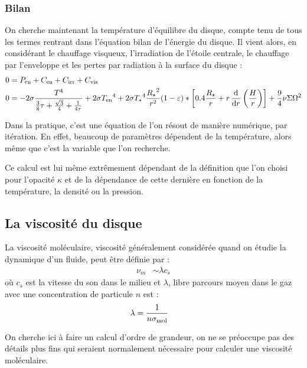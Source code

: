 \subsubsection{Bilan}
On cherche maintenant la température d'équilibre du disque, compte tenu de tous les termes rentrant dans l'équation bilan de l'énergie du disque. Il vient alors, en considérant le chauffage visqueux, l'irradiation de l'étoile centrale, le chauffage par l'enveloppe et les pertes par radiation à la surface du disque : 
\begin{align}
0 &= P_\text{cn} + C_\text{en} + C_\text{irr} + C_\text{vis}\nonumber\\
0 &= - 2\sigma \frac{T^4}{\frac{3}{8}\tau + \frac{\sqrt{3}}{4} + \inv{4\tau}} + 2 \sigma {T_\text{en}}^4 + 2 \sigma {T_\star}^4 \frac{{R_\star}^2}{r^2} (1-\varepsilon) * \left[0.4 \frac{R_\star}{r} + r \dod{}{r}\left(\frac{H}{r}\right)\right] + \frac{9}{4} \nu\Sigma\Omega^2\label{eq:equation_energie}
\end{align}

Dans la pratique, c'est une équation de l'on résout de manière numérique, par itération. En effet, beaucoup de paramètres dépendent de la température, alors même que c'est la variable que l'on recherche. 

Ce calcul est lui même extrêmement dépendant de la définition que l'on choisi pour l'opacité $\kappa$ et de la dépendance de cette dernière en fonction de la température, la densité ou la pression. 

\subsection{La viscosité du disque}\label{sec:viscosite}%
La viscosité moléculaire, viscosité généralement considérée quand on étudie la dynamique d'un fluide, peut être définie par : 
\begin{align}
\nu_m &\sim \lambda c_s
\end{align}
où $c_s$ est la vitesse du son dans le milieu et $\lambda$, libre parcours moyen dans le gaz avec une concentration de particule $n$ est :
\begin{align}
\lambda &= \frac{1}{n\sigma_\text{mol}}
\end{align}

On cherche ici à faire un calcul d'ordre de grandeur, on ne se préoccupe pas des détails plus fins qui seraient normalement nécessaire pour calculer une viscosité moléculaire. 

